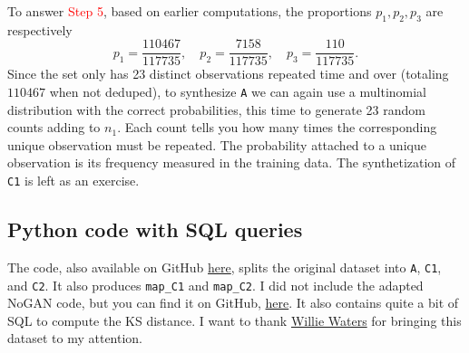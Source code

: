 \documentclass[oneside,10pt]{book}
\begin{document}
To answer \textcolor{red}{Step 5}, based on earlier computations,  the proportions $p_1, p_2, p_3$ are respectively
$$
p_1 = \frac{\num{110467}}{\num{117735}}, \quad p_2 =\frac{ 7158}{\num{117735}}, \quad p_3 = \frac{110}{\num{117735}}.
$$
Since the set  only has 23 distinct observations repeated time and over (totaling $\num{110467}$ when not deduped), to synthesize \texttt{A} we can again use a multinomial distribution with the correct probabilities, this time to generate 23 random counts
 adding to $n_1$. Each count 
 tells you how many times the corresponding unique observation must be repeated. The probability attached to a unique observation is its
 frequency measured in the training data.
 The synthetization of \texttt{C1} is left as an exercise.


\subsection{Python code with SQL queries}\label{gfrk65zs}

The code, also available on GitHub  \href{https://github.com/VincentGranville/Main/blob/main/iot_security.py}{here},
 splits the original dataset into \texttt{A}, \texttt{C1}, and \texttt{C2}. 
It also produces \texttt{map\_C1} and \texttt{map\_C2}. I did not include
 the adapted NoGAN code, but you can find it on GitHub,
 \href{https://github.com/VincentGranville/Main/blob/main/NoGAN_iot.py}{here}. It also contains quite a bit of SQL
 to compute the KS distance. I want to thank \href{https://www.linkedin.com/in/willie-waters-79451350/}{Willie Waters} for bringing this dataset to my attention. \vspace{1ex}
\end{document}
